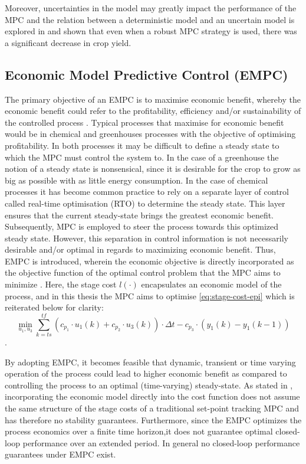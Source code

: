 Moreover, uncertainties in the model may greatly impact the performance of the MPC and the relation between a deterministic model and an uncertain model is explored in \citet{boersmaRobustSamplebasedModel2022} and shown that even when a robust MPC strategy is used, there was a significant decrease in crop yield.

\subsection{Economic Model Predictive Control (EMPC)}
The primary objective of an EMPC is to maximise economic benefit, whereby the economic benefit could refer to the profitability, efficiency and/or sustainability of the controlled process \cite{ellisTutorialReviewEconomic2014}. Typical processes that maximise for economic benefit would be in chemical and greenhouses processes with the objective of optimising profitability. In both processes it may be difficult to define a steady state to which the MPC must control the system to. In the case of a greenhouse the notion of a steady state is nonsensical, since it is desirable for the crop to grow as big as possible with as little energy consumption. In the case of chemical processes it has become common practice to rely on a separate layer of control called real-time optimisation (RTO) to determine the steady state. This layer ensures that the current steady-state brings the greatest economic benefit. Subsequently, MPC is employed to steer the process towards this optimized steady state. However, this separation in control information is not necessarily desirable and/or optimal in regards to maximizing economic benefit. Thus, EMPC is introduced, wherein the economic objective is directly incorporated as the objective function of the optimal control problem that the MPC aims to minimize \cite{rawlingsFundamentalsEconomicModel2012}. Here, the stage cost $l(\cdot)$ encapsulates an economic model of the process, and in this thesis the MPC aims to optimise \autoref{eq:stage-cost-epi} which is reiterated below for clarity: $$\min_{u_1,u_3} \sum_{k = ts}^{tf} {(c_{p_1} \cdot u_1(k) + c_{p_2} \cdot u_3(k))\cdot \Delta t - c_{p_3} \cdot (y_1(k) - y_1(k-1))}$$.

By adopting EMPC, it becomes feasible that dynamic, transient or time varying operation of the process could lead to higher economic benefit as compared to controlling the process to an optimal (time-varying) steady-state. As stated in \cite{rawlingsFundamentalsEconomicModel2012}, incorporating the economic model directly into the cost function does not assume the same structure of the stage costs of a traditional set-point tracking MPC and has therefore no stability guarantees. Furthermore, since the EMPC optimizes the process economics  over a finite time horizon,it does not guarantee optimal closed-loop performance over an extended period. In general no closed-loop performance guarantees under EMPC exist\cite{ellisTutorialReviewEconomic2014}.

